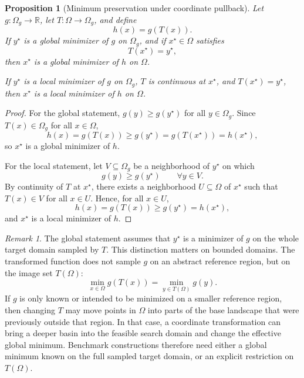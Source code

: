 \documentclass[11pt,a4paper]{article}
\theoremstyle{remark}
\newtheorem{remark}{Remark}
\theoremstyle{plain}
\newtheorem{proposition}{Proposition}
\begin{document}
\begin{proposition}[Minimum preservation under coordinate pullback]
	\label{prop:coordinate-pullback-minimum}
	Let \(g:\Omega_g\to\mathbb{R}\), let \(T:\Omega\to\Omega_g\), and define
	\[
	h(x)=g(T(x)).
	\]
	If \(y^\star\) is a global minimizer of \(g\) on \(\Omega_g\), and if
	\(x^\star\in\Omega\) satisfies
	\[
	T(x^\star)=y^\star,
	\]
	then \(x^\star\) is a global minimizer of \(h\) on \(\Omega\).
	
	If \(y^\star\) is a local minimizer of \(g\) on \(\Omega_g\), \(T\) is
	continuous at \(x^\star\), and \(T(x^\star)=y^\star\), then \(x^\star\) is a
	local minimizer of \(h\) on \(\Omega\).
\end{proposition}

\begin{proof}
	For the global statement, \(g(y)\ge g(y^\star)\) for all \(y\in\Omega_g\).
	Since \(T(x)\in\Omega_g\) for all \(x\in\Omega\),
	\[
	h(x)=g(T(x))\ge g(y^\star)=g(T(x^\star))=h(x^\star),
	\]
	so \(x^\star\) is a global minimizer of \(h\).
	
	For the local statement, let \(V\subseteq\Omega_g\) be a neighborhood of
	\(y^\star\) on which
	\[
	g(y)\ge g(y^\star)
	\qquad
	\forall y\in V.
	\]
	By continuity of \(T\) at \(x^\star\), there exists a neighborhood
	\(U\subseteq\Omega\) of \(x^\star\) such that \(T(x)\in V\) for all
	\(x\in U\). Hence, for all \(x\in U\),
	\[
	h(x)=g(T(x))\ge g(y^\star)=h(x^\star),
	\]
	and \(x^\star\) is a local minimizer of \(h\).
\end{proof}

\begin{remark}
	The global statement assumes that \(y^\star\) is a minimizer of \(g\) on the
	whole target domain sampled by \(T\). This distinction matters on bounded
	domains. The transformed function does not sample \(g\) on an abstract
	reference region, but on the image set \(T(\Omega)\):
	\[
	\min_{x\in\Omega} g(T(x))
	=
	\min_{y\in T(\Omega)} g(y).
	\]
	If \(g\) is only known or intended to be minimized on a smaller reference
	region, then changing \(T\) may move points in \(\Omega\) into parts of the
	base landscape that were previously outside that region. In that case, a
	coordinate transformation can bring a deeper basin into the feasible search
	domain and change the effective global minimum. Benchmark constructions
	therefore need either a global minimum known on the full sampled target
	domain, or an explicit restriction on \(T(\Omega)\).
\end{remark}
\end{document}
